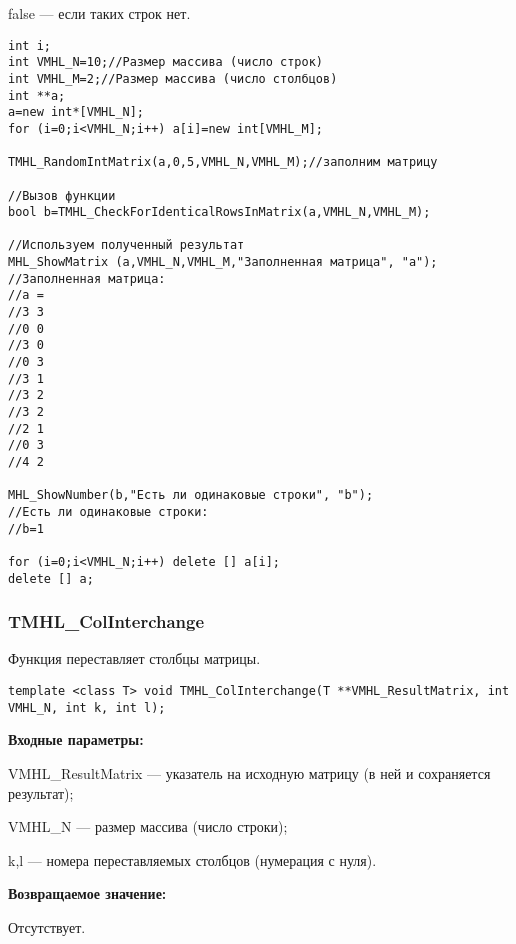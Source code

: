 \documentclass[a4paper,12pt]{article}
\begin{document}
 false --- если таких строк нет.


\begin{lstlisting}[label=code_use_TMHL_CheckForIdenticalRowsInMatrix,caption=Пример использования]
int i;
int VMHL_N=10;//Размер массива (число строк)
int VMHL_M=2;//Размер массива (число столбцов)
int **a;
a=new int*[VMHL_N];
for (i=0;i<VMHL_N;i++) a[i]=new int[VMHL_M];

TMHL_RandomIntMatrix(a,0,5,VMHL_N,VMHL_M);//заполним матрицу

//Вызов функции
bool b=TMHL_CheckForIdenticalRowsInMatrix(a,VMHL_N,VMHL_M);

//Используем полученный результат
MHL_ShowMatrix (a,VMHL_N,VMHL_M,"Заполненная матрица", "a");
//Заполненная матрица:
//a =
//3	3
//0	0
//3	0
//0	3
//3	1
//3	2
//3	2
//2	1
//0	3
//4	2

MHL_ShowNumber(b,"Есть ли одинаковые строки", "b");
//Есть ли одинаковые строки:
//b=1

for (i=0;i<VMHL_N;i++) delete [] a[i];
delete [] a;
\end{lstlisting}

\subsubsection{TMHL\_ColInterchange}\label{TMHL_ColInterchange}

Функция переставляет столбцы матрицы.


\begin{lstlisting}[label=code_syntax_TMHL_ColInterchange,caption=Синтаксис]
template <class T> void TMHL_ColInterchange(T **VMHL_ResultMatrix, int VMHL_N, int k, int l);
\end{lstlisting}

\textbf{Входные параметры:} 
 
VMHL\_ResultMatrix --- указатель на исходную матрицу (в ней и сохраняется результат);
 
VMHL\_N --- размер массива (число строки);
 
k,l --- номера переставляемых столбцов (нумерация с нуля).

\textbf{Возвращаемое значение:}

Отсутствует.
\end{document}
